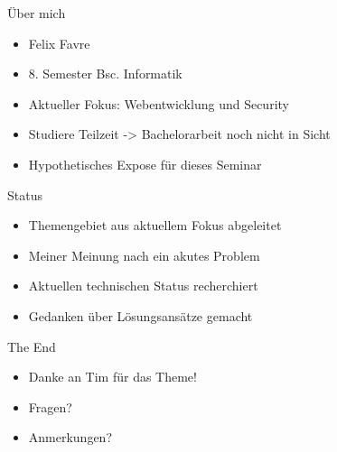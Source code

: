 \documentclass{beamer}
\institute{Universität Hamburg -- Fachbereich Informatik -- Abschlussarbeiten Seminar}
\date[15.04.2015]{22. April 2015}
\title{\myTitle}
\author{\myName}
\begin{document}
{
    \frame{  
        \titlepage
    }
}

\begin{frame}{Über mich}
  \begin{itemize}
    \item Felix Favre
    \item 8. Semester Bsc. Informatik
    \item Aktueller Fokus: Webentwicklung und Security
    \pause
    \item Studiere Teilzeit -> Bachelorarbeit noch nicht in Sicht
    \item Hypothetisches Expose für dieses Seminar
  \end{itemize}
\end{frame}

\begin{frame}{Status}
  \begin{itemize}
    \item Themengebiet aus aktuellem Fokus abgeleitet
    \item Meiner Meinung nach ein akutes Problem
    \item Aktuellen technischen Status recherchiert
    \item Gedanken über Lösungsansätze gemacht
  \end{itemize}
\end{frame}

\begin{frame}{The End}
  \begin{itemize}
    \item Danke an Tim für das Theme!
    \item Fragen?
    \item Anmerkungen?
  \end{itemize}
\end{frame}
\end{document}

